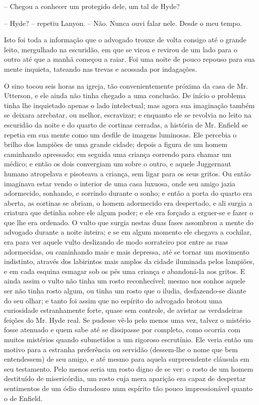 -- Chegou a conhecer um protegido dele, um tal de Hyde?

-- Hyde? -- repetiu Lanyon. -- Não.  Nunca ouvi falar nele.  Desde o meu
tempo.

Isto foi toda a informação que o advogado trouxe de volta consigo até o
grande leito, mergulhado na escuridão, em que se virou e revirou de um
lado para o outro até que a manhã começou a raiar.  Foi uma noite de
pouco repouso para sua mente inquieta, tateando nas trevas e acossada
por indagações.

O sino tocou seis horas na igreja, tão convenientemente próxima da casa
de Mr. Utterson, e ele ainda não tinha chegado a uma conclusão.  De
início o problema tinha lhe inquietado apenas o lado intelectual; mas
agora sua imaginação também se deixara arrebatar, ou melhor,
escravizar; e enquanto ele se revolvia no leito na escuridão da noite e
do quarto de cortinas cerradas, a história de Mr. Enfield se repetia em
sua mente como um desfile de imagens luminosas.  Ele percebia o brilho
dos lampiões de uma grande cidade; depois a figura de um homem
caminhando apressado; em seguida uma criança correndo para chamar um
médico; e então os dois convergiam um sobre o outro, e aquele
Juggernaut humano atropelava e pisoteava a criança, sem ligar para os
seus gritos.  Ou então imaginava estar vendo o interior de uma casa
luxuosa, onde seu amigo jazia adormecido, sonhando, e sorrindo durante
o sonho; e então a porta do quarto era aberta, as cortinas se abriam, o
homem adormecido era despertado, e ali surgia a criatura que detinha
sobre ele algum poder; e ele era forçado a erguer-se e fazer o que lhe
era ordenado.  O vulto que surgia nestas duas fases assombrou a mente
do advogado durante a noite inteira; e se em algum momento ele chegava
a cochilar, era para ver aquele vulto deslizando de modo sorrateiro por
entre as ruas adormecidas, ou caminhando mais e mais depressa, até se
tornar um movimento indistinto, através dos labirintos mais amplos da
cidade iluminada pelos lampiões, e em cada esquina esmagar sob os pés
uma criança e abandoná-la aos gritos.  E ainda assim o vulto não tinha
um rosto reconhecível; mesmo nos sonhos aquele ser não tinha rosto
algum, ou tinha um rosto que o iludia, desfazendo-se diante do seu
olhar; e tanto foi assim que no espírito do advogado brotou uma
curiosidade estranhamente forte, quase sem controle, de avistar as
verdadeiras feições do Mr. Hyde real.  Se pudesse vê-lo pelo menos uma
vez, talvez o mistério fosse atenuado e quem sabe até se dissipasse por
completo, como ocorria com muitos mistérios quando submetidos a um
rigoroso escrutínio.  Ele veria então um motivo para a estranha
preferência ou servidão (dessem-lhe o nome que bem entendessem) de seu
amigo, e até mesmo para aquela surpreendente cláusula em seu
testamento.  Pelo menos seria um rosto digno de se ver: o rosto de um
homem destituído de misericórdia, um rosto cuja mera aparição era capaz
de despertar sentimentos de um ódio duradouro num espírito tão pouco
impressionável quanto o de Enfield.

